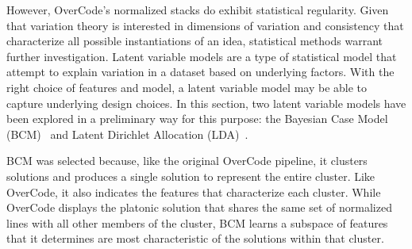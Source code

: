 




However, OverCode's normalized stacks do exhibit statistical regularity. Given that variation theory is interested in dimensions of variation and consistency that characterize all possible instantiations of an idea, statistical methods warrant further investigation. Latent variable models are a type of statistical model that attempt to explain variation in a dataset based on underlying factors. With the right choice of features and model, a latent variable model may be able to capture underlying design choices. In this section, two latent variable models have been explored in a preliminary way for this purpose: the Bayesian Case Model (BCM)~\cite{bcm} and Latent Dirichlet Allocation (LDA)~\cite{lda}. 

BCM was selected because, like the original OverCode pipeline, it clusters solutions and produces a single solution to represent the entire cluster. Like OverCode, it also indicates the features that characterize each cluster. While OverCode displays the platonic solution that shares the same set of normalized lines with all other members of the cluster, BCM learns a subspace of features that it determines are most characteristic of the solutions within that cluster. 

